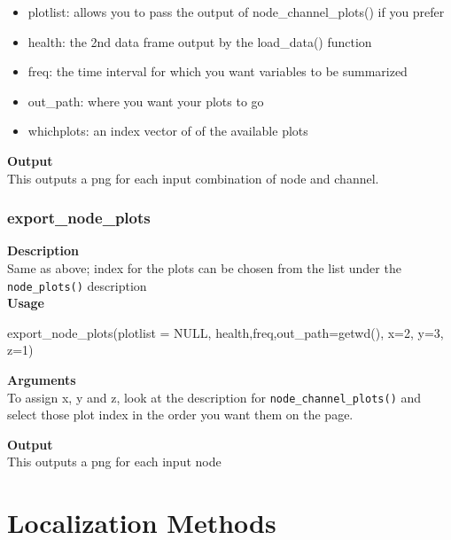\documentclass[
]{book}
\newenvironment{Shaded}{\begin{snugshade}}{\end{snugshade}}
\newcommand{\AttributeTok}[1]{\textcolor[rgb]{0.77,0.63,0.00}{#1}}
\newcommand{\ConstantTok}[1]{\textcolor[rgb]{0.00,0.00,0.00}{#1}}
\newcommand{\DecValTok}[1]{\textcolor[rgb]{0.00,0.00,0.81}{#1}}
\newcommand{\FunctionTok}[1]{\textcolor[rgb]{0.00,0.00,0.00}{#1}}
\newcommand{\NormalTok}[1]{#1}
\providecommand{\tightlist}{%
  \setlength{\itemsep}{0pt}\setlength{\parskip}{0pt}}
\begin{document}
\begin{itemize}
\tightlist
\item
  plotlist: allows you to pass the output of node\_channel\_plots() if you prefer\\
\item
  health: the 2nd data frame output by the load\_data() function\\
\item
  freq: the time interval for which you want variables to be summarized\\
\item
  out\_path: where you want your plots to go\\
\item
  whichplots: an index vector of of the available plots
\end{itemize}

\textbf{Output}\\
This outputs a png for each input combination of node and channel.

\hypertarget{export_node_plots}{%
\subsection{export\_node\_plots}\label{export_node_plots}}

\textbf{Description}\\
Same as above; index for the plots can be chosen from the list under the \texttt{node\_plots()} description\\
\textbf{Usage}

\begin{Shaded}
\begin{Highlighting}[]
\FunctionTok{export\_node\_plots}\NormalTok{(}\AttributeTok{plotlist =} \ConstantTok{NULL}\NormalTok{, health,freq,}\AttributeTok{out\_path=}\FunctionTok{getwd}\NormalTok{(), }\AttributeTok{x=}\DecValTok{2}\NormalTok{, }\AttributeTok{y=}\DecValTok{3}\NormalTok{, }\AttributeTok{z=}\DecValTok{1}\NormalTok{)  }
\end{Highlighting}
\end{Shaded}

\textbf{Arguments}\\
To assign x, y and z, look at the description for \texttt{node\_channel\_plots()} and select those plot index in the order you want them on the page.

\textbf{Output}\\
This outputs a png for each input node

\hypertarget{localization-methods}{%
\chapter{Localization Methods}\label{localization-methods}}
\end{document}
